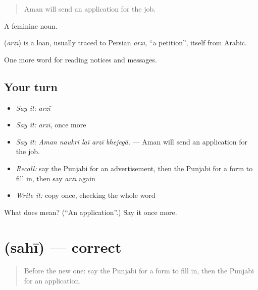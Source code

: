 \begin{quote}
Aman will send an application for the job.
\end{quote}

A feminine noun.

\begin{cousinweb}
\textbf{} (\emph{arzī}) is a loan, usually traced to Persian \emph{arzī}, \textquotedblleft{}a petition\textquotedblright{}, itself from Arabic.
\end{cousinweb}

\begin{grammarlens}[title={What you've built}]
One more word for reading notices and messages.
\end{grammarlens}

\subsection*{Your turn}
\begin{itemize}
\raggedright
  \item \emph{Say it:} \emph{arzī}
  \item \emph{Say it:} \emph{arzī}, once more
  \item \emph{Say it:} \emph{Aman naukrī laī arzī bhejegā.} — Aman will send an application for the job.
  \item \emph{Recall:} say the Punjabi for an advertisement, then the Punjabi for a form to fill in, then say \emph{arzī} again
  \item \emph{Write it:} copy \textbf{} once, checking the whole word
\end{itemize}

\begin{tcolorbox}[breakable,colback=teal!4,colframe=teal!35!black,title={Before you move on}]
What does  mean? (\textquotedblleft{}An application\textquotedblright{}.) Say it once more.
\end{tcolorbox}
\section[\texorpdfstring{\pa{ਸਹੀ} (sahī)}{ਸਹੀ (sahī)}]{ (sahī) — correct}

\label{lesson:PA-C254-sahi}



\begin{quote}
Before the new one: say the Punjabi for a form to fill in, then the Punjabi for an application.
\end{quote}

